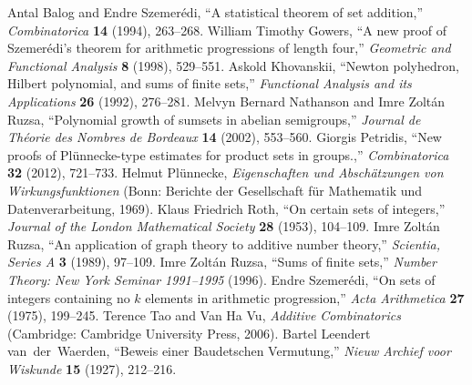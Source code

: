\beginref
Antal Balog
and Endre Szemer\'edi,
``A statistical theorem of set addition,''
{\sl Combinatorica}\/
{\bf 14}
(1994),
263--268.
\endref
\beginref
William Timothy Gowers,
``A new proof of Szemer\'edi's theorem for arithmetic progressions of length four,''
{\sl Geometric and Functional Analysis}\/
{\bf 8}
(1998),
529--551.
\endref
\beginref
Askold Khovanskii,
``Newton polyhedron, Hilbert polynomial, and sums of finite sets,''
{\sl Functional Analysis and its Applications}\/
{\bf 26}
(1992),
276--281.
\endref
\beginref
Melvyn Bernard Nathanson
and Imre Zolt\'an Ruzsa,
``Polynomial growth of sumsets in abelian semigroups,''
{\sl Journal de Th\'eorie des Nombres de Bordeaux}\/
{\bf 14}
(2002),
553--560.
\endref
\beginref
Giorgis Petridis,
``New proofs of Pl\"unnecke-type estimates for product sets in groups.,''
{\sl Combinatorica}\/
{\bf 32}
(2012),
721--733.
\endref
\beginref
Helmut Pl\"unnecke,
{\sl Eigenschaften und Absch\"atzungen von Wirkungsfunktionen}
(Bonn:
Berichte der Gesellschaft f\"ur Mathematik und Datenverarbeitung,
1969).
\endref
\beginref
Klaus Friedrich Roth,
``On certain sets of integers,''
{\sl Journal of the London Mathematical Society}\/
{\bf 28}
(1953),
104--109.
\endref
\beginref
Imre Zolt\'an Ruzsa,
``An application of graph theory to additive number theory,''
{\sl Scientia, Series A}\/
{\bf 3}
(1989),
97--109.
\endref
\beginref
Imre Zolt\'an Ruzsa, ``Sums of finite sets,'' {\sl Number Theory: New York Seminar 1991--1995} (1996).
\endref
\beginref
Endre Szemer\'edi,
``On sets of integers containing no $k$ elements in arithmetic progression,''
{\sl Acta Arithmetica}\/
{\bf 27}
(1975),
199--245.
\endref
\beginref
Terence Tao
and Van Ha Vu,
{\sl Additive Combinatorics}
(Cambridge:
Cambridge University Press,
2006).
\endref
\beginref
Bartel Leendert van~der~Waerden,
``Beweis einer Baudetschen Vermutung,''
{\sl Nieuw Archief voor Wiskunde}\/
{\bf 15}
(1927),
212--216.
\endref
\beginref
\goodbreak\bye
